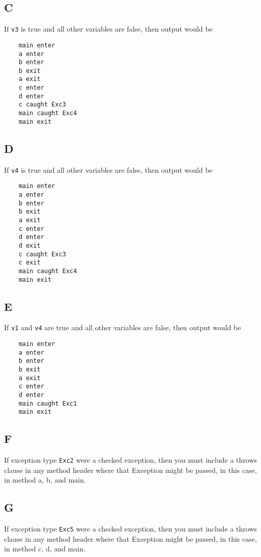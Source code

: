 \documentclass[11pt,letterpaper]{article}
\begin{document}
\subsection*{C}
If \texttt{v3} is true and all other variables are false, then output would be
\begin{lstlisting}
	main enter
	a enter
	b enter
	b exit
	a exit
	c enter
	d enter
	c caught Exc3
	main caught Exc4
	main exit
\end{lstlisting}

\subsection*{D}
If \texttt{v4} is true and all other variables are false, then output would be
\begin{lstlisting}
	main enter
	a enter
	b enter
	b exit
	a exit
	c enter
	d enter
	d exit
	c caught Exc3
	c exit
	main caught Exc4
	main exit
\end{lstlisting}

\subsection*{E}
If \texttt{v1} and \texttt{v4} are true and all other variables are false, then output would be
\begin{lstlisting}
	main enter
	a enter
	b enter
	b exit
	a exit
	c enter
	d enter
	main caught Exc1
	main exit
\end{lstlisting}

\subsection*{F}
If exception type \texttt{Exc2} were a checked exception, then you must include a throws clause in any method header where that Exception might be passed, in this case, in method a, b, and main.

\subsection*{G}
If exception type \texttt{Exc5} were a checked exception, then you must include a throws clause in any method header where that Exception might be passed, in this case, in method c, d, and main.
\end{document}
